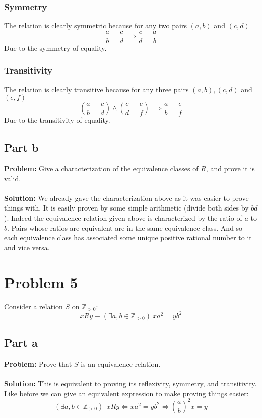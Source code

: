 \documentclass{article}
\begin{document}
\subsubsection*{Symmetry}
The relation is clearly symmetric because for any two pairs $(a,b)$ and $(c,d)$
$$\frac{a}{b}=\frac{c}{d}\implies\frac{c}{d}=\frac{a}{b}$$
Due to the symmetry of equality.

\subsubsection*{Transitivity}
The relation is clearly transitive because for any three pairs $(a,b),(c,d)$ and $(e,f)$
$$\left(\frac{a}{b}=\frac{c}{d}\right)\wedge\left(\frac{c}{d}=\frac{e}{f}\right)\implies\frac{a}{b}=\frac{e}{f}$$
Due to the transitivity of equality.

\subsection*{Part b}
\textbf{Problem:} Give a characterization of the equivalence classes of $R$, and prove it is valid.
\\\\
\textbf{Solution:} We already gave the characterization above as it was easier to prove things with. It is easily proven by some simple arithmetic (divide both sides by $bd$). Indeed the equivalence relation given above is characterized by the ratio of $a$ to $b$. Pairs whose ratios are equivalent are in the same equivalence class. And so each equivalence class has associated some unique positive rational number to it and vice versa.

\section*{Problem 5}
Consider a relation $S$ on $\mathbb Z_{>0}$:
$$xRy\equiv (\exists a,b\in\mathbb Z_{>0})\ xa^2=yb^2$$

\subsection*{Part a}
\textbf{Problem:} Prove that $S$ is an equivalence relation.
\\\\
\textbf{Solution:} This is equivalent to proving its reflexivity, symmetry, and transitivity. Like before we can give an equivalent expression to make proving things easier:
$$(\exists a,b\in\mathbb Z_{>0})\ \ xRy\iff xa^2=yb^2\iff \left(\frac{a}{b}\right)^2x=y$$
\end{document}
